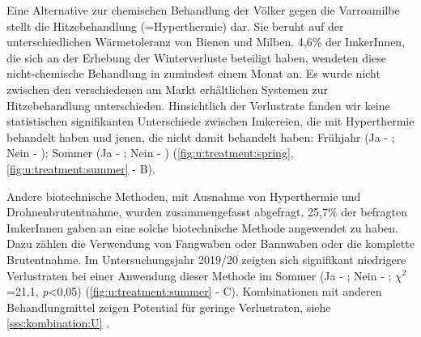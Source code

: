 
Eine Alternative zur chemischen Behandlung der Völker gegen die Varroamilbe stellt die Hitzebehandlung (=Hyperthermie) dar. Sie beruht auf der unterschiedlichen Wärmetoleranz von Bienen und Milben. 4,6\% der ImkerInnen, die sich an der Erhebung der Winterverluste beteiligt haben, wendeten diese nicht-chemische Behandlung in zumindest einem Monat an. Es wurde nicht zwischen den verschiedenen am Markt erhältlichen Systemen zur Hitzebehandlung unterschieden. Hinsichtlich der Verlustrate fanden wir keine statistischen signifikanten Unterschiede zwischen Imkereien, die mit Hyperthermie behandelt haben und jenen, die nicht damit behandelt haben: Frühjahr (Ja - ; Nein - ); Sommer (Ja - ; Nein - ) (\cref{fig:u:treatment:spring}, \cref{fig:u:treatment:summer} - B).


Andere biotechnische Methoden, mit Ausnahme von Hyperthermie und Drohnenbrutentnahme, wurden zusammengefasst abgefragt. 25,7\% der befragten ImkerInnen gaben an eine solche biotechnische Methode angewendet zu haben. Dazu zählen die Verwendung von Fangwaben oder Bannwaben oder die komplette Brutentnahme.
\newline
Im Untersuchungsjahr 2019/20 zeigten sich signifikant niedrigere Verlustraten bei einer Anwendung dieser Methode im Sommer (Ja - ; Nein - ; $\chi^{2}$=21,1, \textit{p}<0,05) (\cref{fig:u:treatment:summer} - C). Kombinationen mit anderen Behandlungmittel zeigen Potential für geringe Verlustraten, siehe \ref{sss:kombination:U} .

\label{sss:kombination:U}

